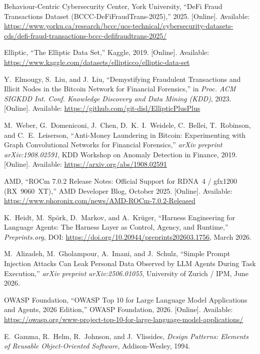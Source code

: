 \documentclass[12pt,a4paper]{report}
\begin{document}
{\begin{enumerate}[label={[\arabic*]}]
\item Behaviour-Centric Cybersecurity Center, York University, ``DeFi Fraud Transactions Dataset (BCCC-DeFiFraudTrans-2025),'' 2025. [Online]. Available: \url{https://www.yorku.ca/research/bccc/ucs-technical/cybersecurity-datasets-cds/defi-fraud-transactions-bccc-defifraudtrans-2025/}

\item Elliptic, ``The Elliptic Data Set,'' Kaggle, 2019. [Online]. Available: \url{https://www.kaggle.com/datasets/ellipticco/elliptic-data-set}

\item Y.~Elmougy, S.~Liu, and J.~Liu, ``Demystifying Fraudulent Transactions and Illicit Nodes in the Bitcoin Network for Financial Forensics,'' in \textit{Proc. ACM SIGKDD Int. Conf. Knowledge Discovery and Data Mining (KDD)}, 2023. [Online]. Available: \url{https://github.com/git-disl/EllipticPlusPlus}

\item M.~Weber, G.~Domeniconi, J.~Chen, D.~K.~I.~Weidele, C.~Bellei, T.~Robinson, and C.~E.~Leiserson, ``Anti-Money Laundering in Bitcoin: Experimenting with Graph Convolutional Networks for Financial Forensics,'' \textit{arXiv preprint arXiv:1908.02591}, KDD Workshop on Anomaly Detection in Finance, 2019. [Online]. Available: \url{https://arxiv.org/abs/1908.02591}

\item AMD, ``ROCm 7.0.2 Release Notes: Official Support for RDNA~4 / gfx1200 (RX~9060~XT),'' AMD Developer Blog, October 2025. [Online]. Available: \url{https://www.phoronix.com/news/AMD-ROCm-7.0.2-Released}


\item K.~Heidt, M.~Sp\"{o}rk, D.~Markov, and A.~Kr\"{u}ger, ``Harness Engineering
for Language Agents: The Harness Layer as Control, Agency, and Runtime,''
\textit{Preprints.org}, DOI: \url{https://doi.org/10.20944/preprints202603.1756},
March 2026.

\item M.~Alizadeh, M.~Gholampour, A.~Imani, and J.~Schulz, ``Simple Prompt
Injection Attacks Can Leak Personal Data Observed by LLM Agents During Task
Execution,'' \textit{arXiv preprint arXiv:2506.01055}, University of Zurich / IPM,
June 2026.

\item OWASP Foundation, ``OWASP Top 10 for Large Language Model Applications and
Agents, 2026 Edition,'' OWASP Foundation, 2026. [Online]. Available:
\url{https://owasp.org/www-project-top-10-for-large-language-model-applications/}

\item E.~Gamma, R.~Helm, R.~Johnson, and J.~Vlissides, \textit{Design Patterns:
Elements of Reusable Object-Oriented Software}, Addison-Wesley, 1994.

\end{enumerate}
}
\end{document}
